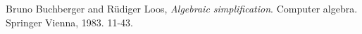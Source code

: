 \begin{thebibliography}{1}



Bruno Buchberger and Rüdiger Loos, \emph{Algebraic simplification}. Computer
algebra. Springer Vienna, 1983. 11-43.

\end{thebibliography}
